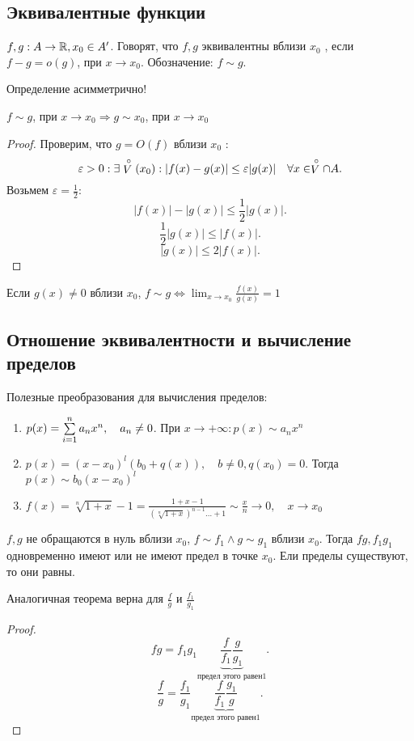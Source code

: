 \documentclass[12pt]{report}
\begin{document}
\subsection{Эквивалентные функции}\label{ques_40}
\begin{defn}
    $f, g : A \to  \mathbb{R}, x_0 \in A'$. Говорят, что $f, g$ эквивалентны вблизи $x_0$ , если $f-g = o(g)$, при $x \to  x_0$. Обозначение: $f \sim g$.
\end{defn}
\begin{note}
    Определение асимметрично!
\end{note}
\begin{lm}
    $f \sim g$, при $x \to  x_0 \Longrightarrow g \sim x_0$, при $x \to  x_0$
\end{lm}
\begin{proof}
    Проверим, что $g = O(f)$ вблизи  $x_0$ :
    \[
	\varepsilon >0: \exists \stackrel \circ V(x_0): |f(x) - g(x)| \le \varepsilon |g(x)| \quad \forall x \in  \stackrel \circ V \cap A
    .\] 
    Возьмем $\varepsilon =\frac{1}{2}$:
    \[
	|f(x)| - |g(x)| \le \frac{1}{2} |g(x)|
    .\] 
    \[
	\frac{1}{2} |g(x)| \le  |f(x)|
    .\] 
    \[
 |g(x)| \le  2|f(x)|
    .\] 
\end{proof}
\begin{note}
    Если $g(x) \ne 0$ вблизи $x_0$, $f \sim g \Longleftrightarrow \lim_{x \to  x_0} \frac{f(x)}{g(x)} =1$
\end{note}
\subsection{Отношение эквивалентности и вычисление пределов}\label{ques_41}
\begin{st}
    Полезные преобразования для вычисления пределов:
    \begin{enumerate}
	\item $p(x) = \sum\limits_{i = 1}^n a_n x^n, \quad a_n \ne 0$. При $x \to +\infty : p(x) \sim a_n x^n$ 
	\item  $p(x) = (x -x_0) ^l (b_0 + q(x)), \quad b \ne 0, q(x_0) = 0$. Тогда $p(x) \sim b_0(x-x_0)^l$
	\item $f(x) = \sqrt[n]{1+x} -1 = \frac{1 + x -1}{(\sqrt[n]{1 + x})^{n-1} \ldots + 1} \sim \frac{x}{n} \to 0, \quad x \to x_0$
    \end{enumerate}
\end{st}
\begin{thm}
    $f, g$ не обращаются в нуль вблизи $x_0$, $f\sim f_1 \wedge g\sim g_1$ вблизи $x_0$. Тогда $fg, f_1g_1$ одновременно имеют или не имеют предел в точке $x_0$. Ели пределы существуют, то они равны.
\end{thm}
\begin{note}
    Аналогичная теорема верна для $\frac{f}{g}$ и $\frac{f_1}{g_1}$
\end{note}
\begin{proof}
    \[
	fg = f_1g_1 \underbrace{\frac{f}{f_1} \frac{g}{g_1}}_{\mbox{предел этого равен} 1}
    .\] 
    \[
	\frac{f}{g} = \frac{f_1}{g_1} \underbrace{\frac{f}{f_1} \frac{g_1}{g}}_{\mbox{предел этого равен} 1}
    .\] 
\end{proof}
\end{document}
